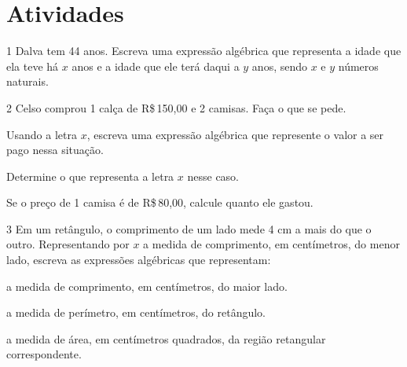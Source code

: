 \section*{Atividades}

\num{1} Dalva tem 44 anos. Escreva uma expressão algébrica que representa a
idade que ela teve há $x$ anos e a idade que ele terá daqui a $y$ anos,
sendo $x$ e $y$ números naturais.




\num{2} Celso comprou 1 calça de R\$\,150,00 e 2 camisas. Faça o que se pede.

\begin{escolha}[itemsep=0pt]
\item Usando a letra $x$, escreva uma expressão algébrica que represente o valor a ser pago nessa situação.



\item Determine o que representa a letra $x$ nesse caso.


\item Se o preço de 1 camisa é de R\$\,80,00, calcule quanto ele gastou.


\end{escolha}

\num{3} Em um retângulo, o comprimento de um lado mede 4 cm a mais do que o
outro. Representando por $x$ a medida de comprimento, em centímetros, do
menor lado, escreva as expressões algébricas que representam:


\begin{escolha}[itemsep=0pt]
\item a medida de comprimento, em centímetros, do maior lado.
\item a medida de perímetro, em centímetros, do retângulo.
\item a medida de área, em centímetros quadrados, da região retangular correspondente.
\end{escolha}

